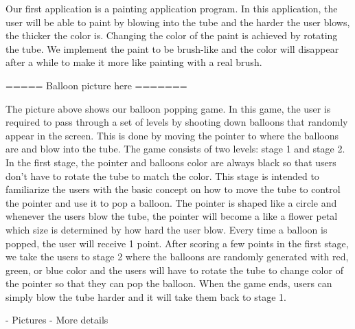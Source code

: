 Our first application is a painting application program. In this application, the user will be able to paint by blowing into the tube and the harder the user blows, the thicker the color is. Changing the color of the paint is achieved by rotating the tube. We implement the paint to be brush-like and the color will disappear after a while to make it more like painting with a real brush.


===== Balloon picture here =======

The picture above shows our balloon popping game. In this game, the user is required to pass through a set of levels by shooting down balloons that randomly appear in the screen. This is done by moving the pointer to where the balloons are and blow into the tube. The game consists of two levels: stage 1 and stage 2. In the first stage, the pointer and balloons color are always black so that users don’t have to rotate the tube to match the color. This stage is intended to familiarize the users with the basic concept on how to move the tube to control the pointer and use it to pop a balloon. The pointer is shaped like a circle and whenever the users blow the tube, the pointer will become a like a flower petal which size is determined by how hard the user blow. Every time a balloon is popped, the user will receive 1 point. After scoring a few points in the first stage, we take the users to stage 2 where the balloons are randomly generated with red, green, or blue color and the users will have to rotate the tube to change color of the pointer so that they can pop the balloon. When the game ends, users can simply blow the tube harder and it will take them back to stage 1. 



\TODO
- Pictures \newline
- More details

